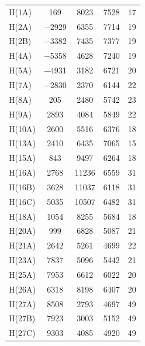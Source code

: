 \begin{center}
\tablelasttail{\bottomrule}
 {\footnotesize \singlespacing
\begin{supertabular}{lcccc}
H(1A)&169&8023&7528&17\\
H(2A)&$-$2929&6355&7714&19\\
H(2B)&$-$3382&7435&7377&19\\
H(4A)&$-$5358&4628&7240&19\\
H(5A)&$-$4931&3182&6721&20\\
H(7A)&$-$2830&2370&6144&22\\
H(8A)&205&2480&5742&23\\
H(9A)&2893&4084&5849&22\\
H(10A)&2600&5516&6376&18\\
H(13A)&2410&6435&7065&15\\
H(15A)&843&9497&6264&18\\
H(16A)&2768&11236&6559&31\\
H(16B)&3628&11037&6118&31\\
H(16C)&5035&10507&6482&31\\
H(18A)&1054&8255&5684&18\\
H(20A)&999&6828&5087&21\\
H(21A)&2642&5261&4699&22\\
H(23A)&7837&5096&5442&21\\
H(25A)&7953&6612&6022&20\\
H(26A)&6318&8198&6407&20\\
H(27A)&8508&2793&4697&49\\
H(27B)&7923&3003&5152&49\\
H(27C)&9303&4085&4920&49\\
\end{supertabular}
}
\end{center}

